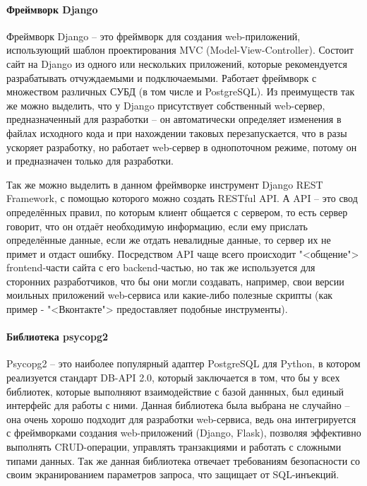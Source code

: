\paragraph{Фреймворк Django}

Фреймворк Django -- это фреймворк для создания web-приложений, использующий шаблон проектирования MVC (Model-View-Controller). Состоит сайт на Django из одного или нескольких приложений, которые рекомендуется разрабатывать отчуждаемыми и подключаемыми. Работает фреймворк с множеством различных СУБД (в том числе и PostgreSQL). Из преимуществ так же можно выделить, что у Django присутствует собственный web-сервер, предназначенный для разработки -- он автоматически определяет изменения в файлах исходного кода и при нахождении таковых перезапускается, что в разы ускоряет разработку, но работает web-сервер в однопоточном режиме, потому он и предназначен только для разработки.

Так же можно выделить в данном фреймворке инструмент Django REST Framework, с помощью которого можно создать RESTful API. А API -- это свод определённых правил, по которым клиент общается с сервером, то есть сервер говорит, что он отдаёт необходимую информацию, если ему прислать определённые данные, если же отдать невалидные данные, то сервер их не примет и отдаст ошибку. Посредством API чаще всего происходит "<общение"> frontend-части сайта с его backend-частью, но так же используется для сторонних разработчиков, что бы они могли создавать, например, свои версии моильных приложений web-сервиса или какие-либо полезные скрипты (как пример - "<Вконтакте"> предоставляет подобные инструменты). 

\paragraph{Библиотека psycopg2}

Psycopg2 -- это наиболее популярный адаптер PostgreSQL для Python, в котором реализуется стандарт DB-API 2.0, который заключается в том, что бы у всех библиотек, которые выполняют взаимодействие с базой даннных, был единый интерфейс для работы с ними. Данная библиотека была выбрана не случайно -- она очень хорошо подходит для разработки web-сервиса, ведь она интегрируется с фреймворками создания web-приложений (Django, Flask), позволяя эффективно выполнять CRUD-операции, управлять транзакциями и работать с сложными типами данных. Так же данная библиотека отвечает требованиям безопасности со своим экранированием параметров запроса, что защищает от SQL-инъекций.

